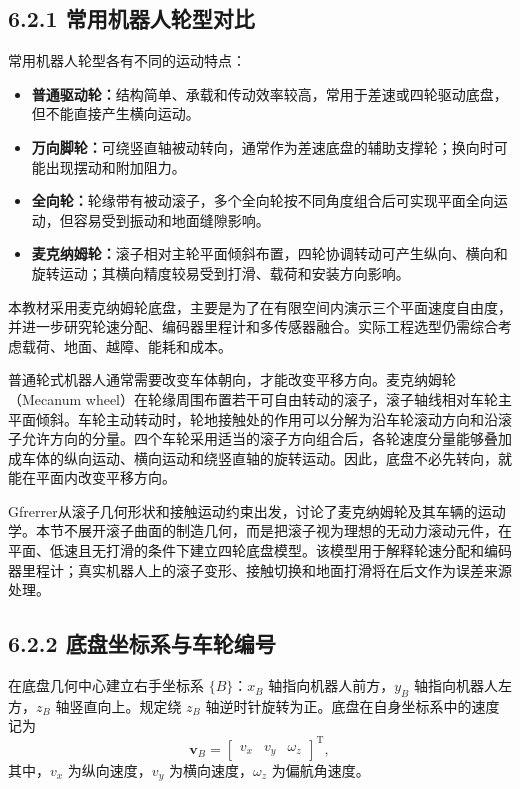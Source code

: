 \documentclass[UTF8,zihao=-4]{ctexart}
\newcommand{\vect}[1]{\bm{#1}}
\begin{document}
\subsection*{6.2.1 常用机器人轮型对比}

常用机器人轮型各有不同的运动特点：
\begin{itemize}
  \item \textbf{普通驱动轮：}结构简单、承载和传动效率较高，常用于差速或四轮驱动底盘，但不能直接产生横向运动。
  \item \textbf{万向脚轮：}可绕竖直轴被动转向，通常作为差速底盘的辅助支撑轮；换向时可能出现摆动和附加阻力。
  \item \textbf{全向轮：}轮缘带有被动滚子，多个全向轮按不同角度组合后可实现平面全向运动，但容易受到振动和地面缝隙影响。
  \item \textbf{麦克纳姆轮：}滚子相对主轮平面倾斜布置，四轮协调转动可产生纵向、横向和旋转运动；其横向精度较易受到打滑、载荷和安装方向影响。
\end{itemize}

本教材采用麦克纳姆轮底盘，主要是为了在有限空间内演示三个平面速度自由度，并进一步研究轮速分配、编码器里程计和多传感器融合。实际工程选型仍需综合考虑载荷、地面、越障、能耗和成本。

普通轮式机器人通常需要改变车体朝向，才能改变平移方向。麦克纳姆轮（Mecanum wheel）在轮缘周围布置若干可自由转动的滚子，滚子轴线相对车轮主平面倾斜。车轮主动转动时，轮地接触处的作用可以分解为沿车轮滚动方向和沿滚子允许方向的分量。四个车轮采用适当的滚子方向组合后，各轮速度分量能够叠加成车体的纵向运动、横向运动和绕竖直轴的旋转运动。因此，底盘不必先转向，就能在平面内改变平移方向。

Gfrerrer从滚子几何形状和接触运动约束出发，讨论了麦克纳姆轮及其车辆的运动学\cite{gfrerrer2008}。本节不展开滚子曲面的制造几何，而是把滚子视为理想的无动力滚动元件，在平面、低速且无打滑的条件下建立四轮底盘模型。该模型用于解释轮速分配和编码器里程计；真实机器人上的滚子变形、接触切换和地面打滑将在后文作为误差来源处理。

\subsection*{6.2.2 底盘坐标系与车轮编号}

在底盘几何中心建立右手坐标系 $\{B\}$：$x_B$ 轴指向机器人前方，$y_B$ 轴指向机器人左方，$z_B$ 轴竖直向上。规定绕 $z_B$ 轴逆时针旋转为正。底盘在自身坐标系中的速度记为
\begin{equation}
  \vect{v}_B =
  \begin{bmatrix}
    v_x & v_y & \omega_z
  \end{bmatrix}^{\mathrm T},
  \label{eq:body-velocity}
\end{equation}
其中，$v_x$ 为纵向速度，$v_y$ 为横向速度，$\omega_z$ 为偏航角速度。
\end{document}
